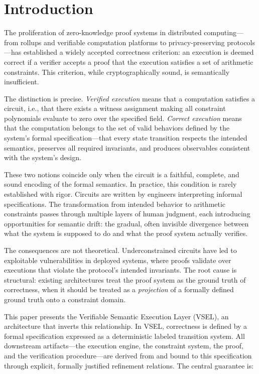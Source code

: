 \documentclass[11pt,a4paper]{article}
\theoremstyle{definition}
\begin{document}
\section{Introduction}
\label{sec:introduction}

The proliferation of zero-knowledge proof systems in distributed computing---from rollups and verifiable computation platforms to privacy-preserving protocols---has established a widely accepted correctness criterion: an execution is deemed correct if a verifier accepts a proof that the execution satisfies a set of arithmetic constraints. This criterion, while cryptographically sound, is semantically insufficient.

The distinction is precise. \emph{Verified execution} means that a computation satisfies a circuit, i.e., that there exists a witness assignment making all constraint polynomials evaluate to zero over the specified field. \emph{Correct execution} means that the computation belongs to the set of valid behaviors defined by the system's formal specification---that every state transition respects the intended semantics, preserves all required invariants, and produces observables consistent with the system's design.

These two notions coincide only when the circuit is a faithful, complete, and sound encoding of the formal semantics. In practice, this condition is rarely established with rigor. Circuits are written by engineers interpreting informal specifications. The transformation from intended behavior to arithmetic constraints passes through multiple layers of human judgment, each introducing opportunities for semantic drift: the gradual, often invisible divergence between what the system is supposed to do and what the proof system actually verifies.

The consequences are not theoretical. Underconstrained circuits have led to exploitable vulnerabilities in deployed systems, where proofs validate over executions that violate the protocol's intended invariants. The root cause is structural: existing architectures treat the proof system as the ground truth of correctness, when it should be treated as a \emph{projection} of a formally defined ground truth onto a constraint domain.

This paper presents the Verifiable Semantic Execution Layer (VSEL), an architecture that inverts this relationship. In VSEL, correctness is defined by a formal specification expressed as a deterministic labeled transition system. All downstream artifacts---the execution engine, the constraint system, the proof, and the verification procedure---are derived from and bound to this specification through explicit, formally justified refinement relations. The central guarantee is:
\end{document}
